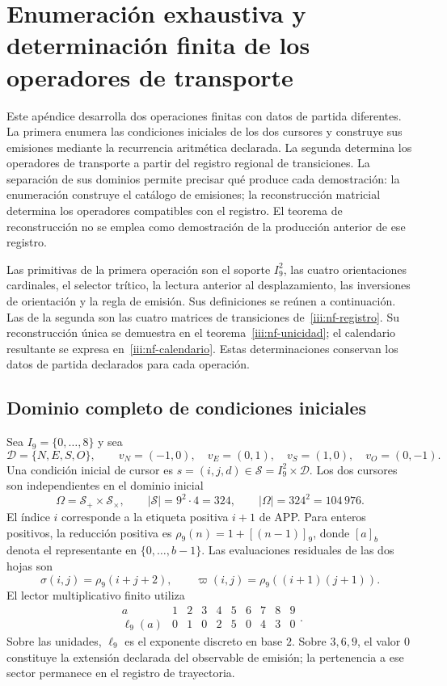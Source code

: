 \section{Enumeración exhaustiva y determinación finita de los operadores de transporte}
\label{iii:nucleo-finito}

Este apéndice desarrolla dos operaciones finitas con datos de partida
diferentes. La primera enumera las condiciones iniciales de los dos cursores
y construye sus emisiones mediante la recurrencia aritmética declarada.
La segunda determina los operadores de transporte a partir del registro
regional de transiciones. La separación de sus dominios permite precisar
qué produce cada demostración: la enumeración construye el catálogo de
emisiones; la reconstrucción matricial determina los operadores compatibles
con el registro. El teorema de reconstrucción no se emplea como demostración
de la producción anterior de ese registro.

Las primitivas de la primera operación son el soporte $I_9^2$, las cuatro
orientaciones cardinales, el selector trítico, la lectura anterior al
desplazamiento, las inversiones de orientación y la regla de emisión.
Sus definiciones se reúnen a continuación. Las de la segunda son las
cuatro matrices de transiciones de~\eqref{iii:nf-registro}.
Su reconstrucción única se demuestra en el
teorema~\ref{iii:nf-unicidad}; el calendario resultante se expresa
en~\eqref{iii:nf-calendario}. Estas determinaciones conservan
los datos de partida declarados para cada operación.

\subsection{Dominio completo de condiciones iniciales}

Sea $I_9=\{0,\ldots,8\}$ y sea
\[
 \mathcal D=\{N,E,S,O\},\qquad
 v_N=(-1,0),\quad v_E=(0,1),\quad
 v_S=(1,0),\quad v_O=(0,-1).
\]
Una condición inicial de cursor es $s=(i,j,d)\in
\mathcal S=I_9^2\times\mathcal D$. Los dos cursores son independientes
en el dominio inicial
\begin{equation}
 \Omega=\mathcal S_+\times\mathcal S_\times,
 \qquad |\mathcal S|=9^2\cdot4=324,
 \qquad |\Omega|=324^2=104\,976.
 \label{iii:nf-dominio}
\end{equation}
El índice $i$ corresponde a la etiqueta positiva $i+1$ de APP. Para
enteros positivos, la reducción positiva es $\rho_9(n)=1+[(n-1)]_9$,
donde $[a]_b$ denota el representante en $\{0,\ldots,b-1\}$.
Las evaluaciones residuales de las dos hojas son
\[
 \sigma(i,j)=\rho_9(i+j+2),\qquad
 \varpi(i,j)=\rho_9((i+1)(j+1)).
\]
El lector multiplicativo finito utiliza
\begin{equation}
 \begin{array}{c|rrrrrrrrr}
 a&1&2&3&4&5&6&7&8&9\\ \hline
 \ell_9(a)&0&1&0&2&5&0&4&3&0
 \end{array}.
 \label{iii:nf-log}
\end{equation}
Sobre las unidades, $\ell_9$ es el exponente discreto en base $2$.
Sobre $3,6,9$, el valor $0$ constituye la extensión declarada del
observable de emisión; la pertenencia a ese sector permanece en el
registro de trayectoria.

